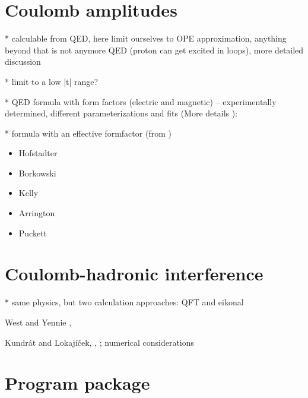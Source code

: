 \documentclass[preprint,12pt]{elsarticle}
\begin{document}

\section{Coulomb amplitudes}\label{s:coul mod}

* calculable from QED, here limit ourselves to OPE approximation, anything beyond that is not anymore QED (proton can get excited in loops), more detailed discussion \cite[section 1.3.6]{jan_thesis}

* limit to a low |t| range?

* QED formula with form factors (electric and magnetic) -- experimentally determined, different parameterizations and fits (More details \cite[section 1.3.1]{jan_thesis}):

* formula with an effective formfactor (from \cite[equation (31)]{block06})

\begin{itemize}
\item Hofstadter \cite{hofstadter58}
\item Borkowski \cite{borkowski74,borkowski75}
\item Kelly \cite{kelly04}
\item Arrington \cite{arrington07}
\item Puckett \cite{puckett10}
\end{itemize}




\section{Coulomb-hadronic interference}\label{s:int mod}

* same physics, but two calculation approaches: QFT and eikonal

West and Yennie \cite{wy68}, \cite[section 1.3.4]{jan_thesis}

Kundr\' at and Lokaj\' i\v cek, \cite{kl94}, \cite[section 1.3.5]{jan_thesis};
numerical considerations \cite[section 1.3.6]{jan_thesis}


\section{Program package}\label{s:prog}
\end{document}
